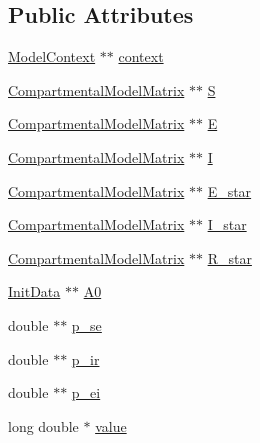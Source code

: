 \subsection*{Public Attributes}
\begin{DoxyCompactItemize}
\item 
\hyperlink{classSpatialSEIR_1_1ModelContext}{Model\-Context} $\ast$$\ast$ \hyperlink{classSpatialSEIR_1_1FC__E0_ace226479b2a1d21777d489e7ff23a395}{context}
\item 
\hyperlink{classSpatialSEIR_1_1CompartmentalModelMatrix}{Compartmental\-Model\-Matrix} $\ast$$\ast$ \hyperlink{classSpatialSEIR_1_1FC__E0_a53998232503fd25c9d74d5c31867cbb9}{S}
\item 
\hyperlink{classSpatialSEIR_1_1CompartmentalModelMatrix}{Compartmental\-Model\-Matrix} $\ast$$\ast$ \hyperlink{classSpatialSEIR_1_1FC__E0_a5e58c11a403f3ed5e8d81710d8381d6a}{E}
\item 
\hyperlink{classSpatialSEIR_1_1CompartmentalModelMatrix}{Compartmental\-Model\-Matrix} $\ast$$\ast$ \hyperlink{classSpatialSEIR_1_1FC__E0_a048432b716d928e7ad3d2d58d448139d}{I}
\item 
\hyperlink{classSpatialSEIR_1_1CompartmentalModelMatrix}{Compartmental\-Model\-Matrix} $\ast$$\ast$ \hyperlink{classSpatialSEIR_1_1FC__E0_aed54e3f0f64667ca2624993257533c25}{E\-\_\-star}
\item 
\hyperlink{classSpatialSEIR_1_1CompartmentalModelMatrix}{Compartmental\-Model\-Matrix} $\ast$$\ast$ \hyperlink{classSpatialSEIR_1_1FC__E0_a5a40eb8abec5db63710a0d84bdad151c}{I\-\_\-star}
\item 
\hyperlink{classSpatialSEIR_1_1CompartmentalModelMatrix}{Compartmental\-Model\-Matrix} $\ast$$\ast$ \hyperlink{classSpatialSEIR_1_1FC__E0_a52c3029c4bf92c378524af2ac180b7c9}{R\-\_\-star}
\item 
\hyperlink{classSpatialSEIR_1_1InitData}{Init\-Data} $\ast$$\ast$ \hyperlink{classSpatialSEIR_1_1FC__E0_af28adc565332fd8e2e3a38e50b7ca182}{A0}
\item 
double $\ast$$\ast$ \hyperlink{classSpatialSEIR_1_1FC__E0_a738e723abd63fed586a769bcbee15d88}{p\-\_\-se}
\item 
double $\ast$$\ast$ \hyperlink{classSpatialSEIR_1_1FC__E0_a69ba193a361160f0ede692f2022d7621}{p\-\_\-ir}
\item 
double $\ast$$\ast$ \hyperlink{classSpatialSEIR_1_1FC__E0_a7d1dafac2b00d11e9b44f94934606621}{p\-\_\-ei}
\item 
long double $\ast$ \hyperlink{classSpatialSEIR_1_1FC__E0_a79d0c47dfdb185a65082c6685cd5b149}{value}
\end{DoxyCompactItemize}


